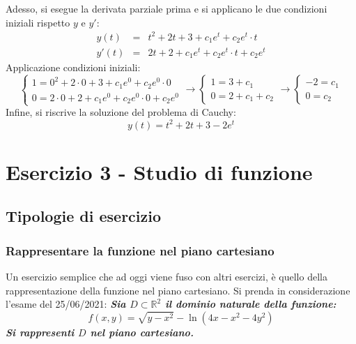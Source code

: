 \documentclass[a4paper]{article}
\begin{document}
	\noindent
	Adesso, si esegue la derivata parziale prima e si applicano le due condizioni iniziali rispetto $y$ e $y'$:
	\begin{equation*}
		\begin{array}{rcl}
			y\left(t\right) &=& t^{2} + 2t + 3 + c_{1} e^{t} + c_{2} e^{t} \cdot t \\ [.5em]
			y'\left(t\right) &=& 2t + 2 + c_{1} e^{t} + c_{2} e^{t} \cdot t + c_{2} e^{t}
		\end{array}
	\end{equation*}
	Applicazione condizioni iniziali:
	\begin{equation*}
		\begin{cases}
			1 = 0^{2} + 2 \cdot 0 + 3 + c_{1}e^{0} + c_{2}e^{0} \cdot 0 \\
			0 = 2 \cdot 0 + 2 + c_{1} e^{0} + c_{2}e^{0} \cdot 0 + c_{2}e^{0}
		\end{cases}
		\rightarrow
		\begin{cases}
			1 = 3 + c_{1} \\
			0 = 2 + c_{1} + c_{2}
		\end{cases}
		\rightarrow
		\begin{cases}
			-2 = c_{1} \\
			0 = c_{2}
		\end{cases}
	\end{equation*}
	Infine, si riscrive la soluzione del problema di Cauchy:
	\begin{equation*}
		y\left(t\right) = t^{2} + 2t + 3 -2e^{t}
	\end{equation*}

	\newpage

	\section{Esercizio 3 - Studio di funzione}

	\subsection{Tipologie di esercizio}

	\subsubsection{Rappresentare la funzione nel piano cartesiano}\label{par: rappresentare la funzione nel piano cartesiano}

	Un esercizio semplice che ad oggi viene fuso con altri esercizi, è quello della rappresentazione della funzione nel piano cartesiano. Si prenda in considerazione l'esame del 25/06/2021: \textcolor{Green4}{\textbf{\emph{Sia $D\subset\mathbb{R}^{2}$ il dominio naturale della funzione:}}
	\begin{equation*}
		f\left(x,y\right) = \sqrt{y-x^{2}}-\ln\left(4x-x^{2}-4y^{2}\right)
	\end{equation*}
	\textbf{\emph{Si rappresenti $D$ nel piano cartesiano.}}}\newline
\end{document}
